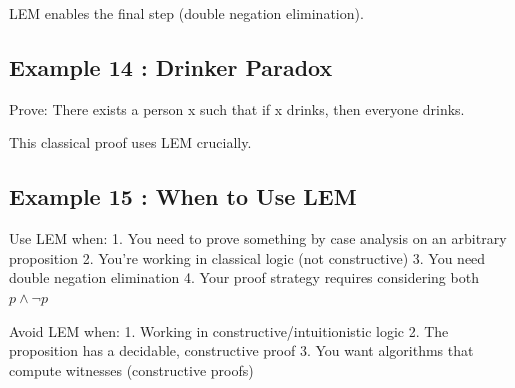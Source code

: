 \documentclass[a4paper,10pt,fleqn]{article}
\begin{document}
\bigskip

\noindent LEM enables the final step (double negation elimination).

\bigskip

\subsection*{Example 14 : Drinker Paradox}

\noindent Prove: There exists a person x such that if x drinks, then everyone drinks.

\bigskip

\begin{center}
\end{center}
\bigskip

\noindent This classical proof uses LEM crucially.

\bigskip

\subsection*{Example 15 : When to Use LEM}

\noindent Use LEM when: 1. You need to prove something by case analysis on an arbitrary proposition 2. You're working in classical logic (not constructive) 3. You need double negation elimination 4. Your proof strategy requires considering both $p \land \lnot p$

\bigskip

\noindent Avoid LEM when: 1. Working in constructive/intuitionistic logic 2. The proposition has a decidable, constructive proof 3. You want algorithms that compute witnesses (constructive proofs)
\end{document}
